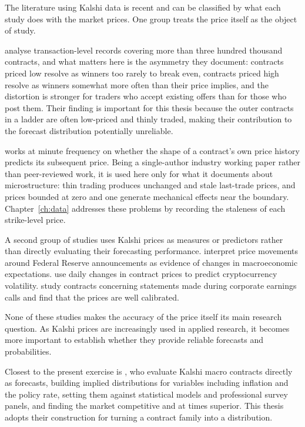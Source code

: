 \documentclass[12pt,a4paper]{report}
\begin{document}
The literature using Kalshi data is recent and can be classified by what each
study does with the market prices. One group treats the price itself as the
object of study.

\textcite{burgi2025} analyse transaction-level records covering more than
three hundred thousand contracts, and what matters here is the asymmetry they
document: contracts priced low resolve as winners too rarely to break even,
contracts priced high resolve as winners somewhat more often than their price
implies, and the distortion is stronger for traders who accept existing offers than for those who post them. Their finding is important for this thesis because the outer contracts in a ladder are often low-priced and thinly traded, making their contribution to the forecast distribution potentially unreliable.

\textcite{greene2026} works at minute
frequency on whether the shape of a contract's own price history predicts its subsequent price. Being a single-author industry working paper
rather than peer-reviewed work, it is used here only for what it documents
about microstructure: thin trading produces unchanged and stale last-trade prices, and prices bounded at zero and one
generate mechanical effects near the boundary. Chapter~\ref{ch:data} addresses these problems by recording the staleness of each strike-level price.

A second group of studies uses Kalshi prices as measures or predictors rather
than directly evaluating their forecasting performance. \textcite{swanson2025}
interpret price movements around Federal Reserve announcements as evidence of
changes in macroeconomic expectations. \textcite{mohanty2026} use daily changes
in contract prices to predict cryptocurrency volatility. \textcite{glaze2026}
study contracts concerning statements made during corporate earnings calls and
find that the prices are well calibrated.

None of these studies makes the accuracy of the price itself its main research
question. As Kalshi prices are increasingly used in applied research, it
becomes more important to establish whether they provide reliable forecasts and
probabilities.

Closest to the present exercise is \textcite{diercks2026}, who evaluate Kalshi
macro contracts directly as forecasts, building implied distributions for
variables including inflation and the policy rate, setting them against
statistical models and professional survey panels, and finding the market
competitive and at times superior. This thesis adopts their construction for
turning a contract family into a distribution.
\end{document}
